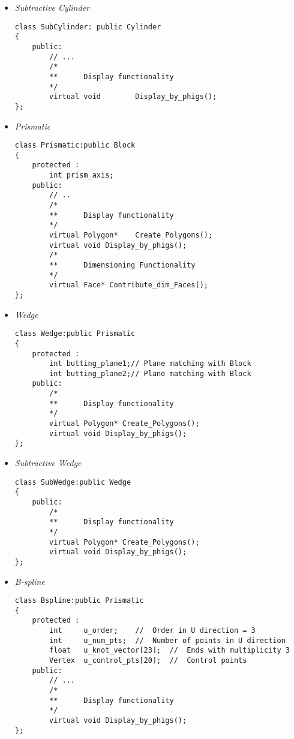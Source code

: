 \begin{itemize}
	\item
	\label{appscyl}
	{\em Subtractive Cylinder}
            \begin{verbatim}
class SubCylinder: public Cylinder
{
    public:
        // ...
        /*
        **      Display functionality
        */
        virtual void        Display_by_phigs();
};
            \end{verbatim}

	\item
	\label{appprm}
	{\em Prismatic}

            \begin{verbatim}
class Prismatic:public Block
{
    protected :
        int prism_axis;
    public:
        // ..
        /*
        **      Display functionality
        */
        virtual Polygon*    Create_Polygons();
        virtual void Display_by_phigs();
        /*
        **      Dimensioning Functionality
        */
        virtual Face* Contribute_dim_Faces();
};
            \end{verbatim}

	\item
	\label{appwed}
	{\em Wedge}

            \begin{verbatim}
class Wedge:public Prismatic
{
    protected :
        int butting_plane1;// Plane matching with Block
        int butting_plane2;// Plane matching with Block
    public:
        /*
        **      Display functionality
        */
        virtual Polygon* Create_Polygons();
        virtual void Display_by_phigs();
};
            \end{verbatim}

	\item
	\label{appswed}
	{\em Subtractive Wedge}

            \begin{verbatim}
class SubWedge:public Wedge
{
    public:
        /*
        **      Display functionality
        */
        virtual Polygon* Create_Polygons();
        virtual void Display_by_phigs();
};
            \end{verbatim}

	\item
	\label{appbspline}
	{\em B-spline}
            \begin{verbatim}
class Bspline:public Prismatic
{
    protected :
        int     u_order;    //  Order in U direction = 3
        int     u_num_pts;  //  Number of points in U direction
        float   u_knot_vector[23];  //  Ends with multiplicity 3
        Vertex  u_control_pts[20];  //  Control points
    public:
        // ...
        /*
        **      Display functionality
        */
        virtual void Display_by_phigs();
};
            \end{verbatim}
\end{itemize}
